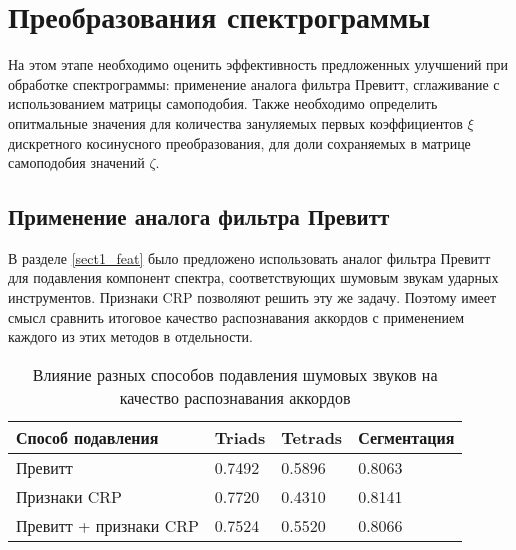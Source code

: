 
\section{Преобразования спектрограммы} \label{sect3_specttrans}

На этом этапе необходимо оценить эффективность предложенных улучшений при
обработке спектрограммы: применение аналога фильтра Превитт, сглаживание с
использованием матрицы самоподобия. Также необходимо определить опитмальные
значения для количества зануляемых первых коэффициентов $\xi$ дискретного
косинусного преобразования, для доли сохраняемых в матрице самоподобия значений
$\zeta$.

\subsection{Применение аналога фильтра Превитт} \label{ssect3_prewitt}

В разделе \ref{sect1_feat} было предложено использовать аналог фильтра Превитт
для подавления компонент спектра, соответствующих шумовым звукам ударных
инструментов. Признаки CRP позволяют решить эту же задачу. Поэтому имеет смысл
сравнить итоговое качество распознавания аккордов с применением каждого из этих
методов в отдельности.

\begin{table} [htbp]
  \centering
  \parbox{15cm}{\caption{Влияние разных способов подавления шумовых звуков на
  качество распознавания аккордов} \label{TPrewitt}}
  \begin{tabular}{|l|l|l|l|}
  \hline
  Способ подавления & Triads & Tetrads & Сегментация \\
  \hline
  Превитт & 0.7492 & 0.5896 & 0.8063 \\
  Признаки CRP & 0.7720 & 0.4310 & 0.8141 \\
  Превитт + признаки CRP & 0.7524 & 0.5520 & 0.8066 \\
  \hline
  \end{tabular}
\end{table}

